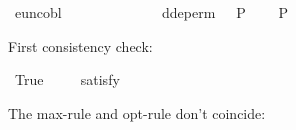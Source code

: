 \begin{isabellebody}
\isamarkupfalse%
\ euncobl\ {\isacharcolon}{\kern0pt}{\isacharcolon}{\kern0pt}\ {\isachardoublequoteopen}{\isasymsigma}{\isasymRightarrow}{\isasymsigma}{\isachardoublequoteclose}\ {\isacharparenleft}{\kern0pt}{\isachardoublequoteopen}\isactrlbold {\isasymcircle}{\isacharless}{\kern0pt}{\isacharunderscore}{\kern0pt}{\isachargreater}{\kern0pt}{\isachardoublequoteclose}{\isacharparenright}{\kern0pt}\ \ \ \isanewline
\ \ \ {\isachardoublequoteopen}\isactrlbold {\isasymcircle}{\isacharless}{\kern0pt}{\isasymphi}{\isachargreater}{\kern0pt}\ {\isasymequiv}\ {\isasymcircle}{\isacharless}{\kern0pt}{\isasymphi}{\isacharbar}{\kern0pt}\isactrlbold {\isasymtop}{\isachargreater}{\kern0pt}{\isachardoublequoteclose}\ \isanewline
{}\isamarkupfalse%
\ ddeperm\ {\isacharcolon}{\kern0pt}{\isacharcolon}{\kern0pt}\ {\isachardoublequoteopen}{\isasymsigma}{\isasymRightarrow}{\isasymsigma}{\isasymRightarrow}{\isasymsigma}{\isachardoublequoteclose}\ {\isacharparenleft}{\kern0pt}{\isachardoublequoteopen}P{\isacharless}{\kern0pt}{\isacharunderscore}{\kern0pt}{\isacharbar}{\kern0pt}{\isacharunderscore}{\kern0pt}{\isachargreater}{\kern0pt}{\isachardoublequoteclose}{\isacharparenright}{\kern0pt}\ \isanewline
\ \ \ {\isachardoublequoteopen}P{\isacharless}{\kern0pt}{\isasympsi}{\isacharbar}{\kern0pt}{\isasymphi}{\isachargreater}{\kern0pt}\ {\isasymequiv}\isactrlbold {\isasymnot}{\isasymcircle}{\isacharless}{\kern0pt}\isactrlbold {\isasymnot}{\isasympsi}{\isacharbar}{\kern0pt}{\isasymphi}{\isachargreater}{\kern0pt}{\isachardoublequoteclose}%
\begin{isamarkuptext}%
First consistency check:%
\end{isamarkuptext}\isamarkuptrue%
\isamarkupfalse%
\ True\ \isanewline
\ \ \isamarkupfalse%
\ {\isacharbrackleft}{\kern0pt}satisfy{\isacharbrackright}{\kern0pt}\ %
\isanewline
%
\isadelimproof
\ \ %
\endisadelimproof
%
\isatagproof
{}\isamarkupfalse%
%
\endisatagproof
{\isafoldproof}%
%
\isadelimproof
%
\endisadelimproof
%
\begin{isamarkuptext}%
The max-rule and opt-rule don't coincide:%
\end{isamarkuptext}\isamarkuptrue%
\isamarkupfalse%
\ {\isachardoublequoteopen}{\isasymodot}{\isacharless}{\kern0pt}{\isasympsi}{\isacharbar}{\kern0pt}{\isasymphi}{\isachargreater}{\kern0pt}\ {\isasymequiv}\ {\isasymcircle}{\isacharless}{\kern0pt}{\isasympsi}{\isacharbar}{\kern0pt}{\isasymphi}{\isachargreater}{\kern0pt}{\isachardoublequoteclose}\ \isanewline

\end{isabellebody}

